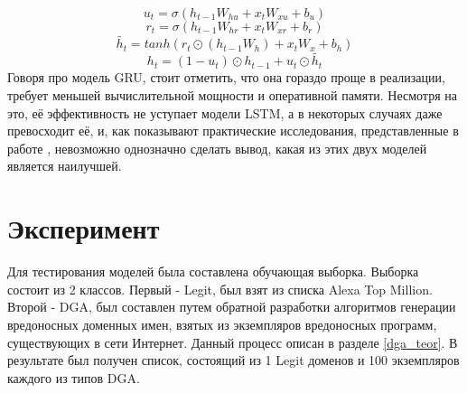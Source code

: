     \begin{equation}\label{gr:1}
    u_{t}=\sigma(h_{t-1} W_{hu} + x_{t} W_{xu} + b_{u})
    \end{equation}
    \begin{equation}\label{gr:2}
    r_{t}=\sigma(h_{t-1} W_{hr} + x_{t} W_{xr} + b_{r})
    \end{equation}
    \begin{equation}\label{gr:3}
    \tilde{h_{t}}=tanh(r_{t} \odot (h_{t-1} W_{h}) + x_{t} W_{x} + b_{h})
    \end{equation}
    \begin{equation}\label{gr:4}
    h_{t}=(1-u_{t}) \odot  h_{t-1} + u_{t} \odot \tilde{h_{t}}
    \end{equation}
    Говоря про модель GRU, стоит отметить, что она гораздо проще в реализации, требует меньшей вычислительной мощности и оперативной памяти. Несмотря на это, её эффективность не уступает модели LSTM, а в некоторых случаях даже превосходит её, и, как показывают практические исследования, представленные в работе \cite{Chung}, невозможно однозначно сделать вывод, какая из этих двух моделей является наилучшей.
\clearpage

\section{Эксперимент}\label{experiment}
    Для тестирования моделей была составлена обучающая выборка. Выборка состоит из 2 классов. Первый - Legit, был взят из списка Alexa Top Million. Второй - DGA, был составлен путем обратной разработки алгоритмов генерации вредоносных доменных имен, взятых из экземпляров вредоносных программ, существующих в сети Интернет. Данный процесс описан в разделе \ref{dga_teor}. В результате был получен список, состоящий из 1 Legit доменов и 100 экземпляров каждого из типов DGA.
